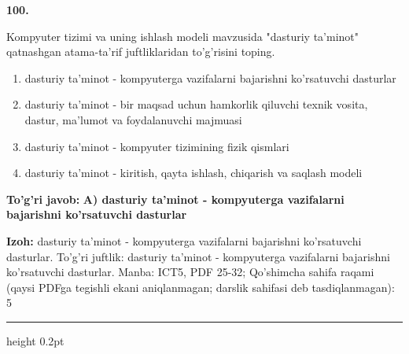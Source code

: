 \documentclass[10pt,a4paper]{article}
\begin{document}
{\bfseries\sffamily\color{ink} 100.}
\par
Kompyuter tizimi va uning ishlash modeli mavzusida "dasturiy ta'minot" qatnashgan atama-ta'rif juftliklaridan to'g'risini toping.
\begin{enumerate}[label=\Alph*),leftmargin=9mm]
\item dasturiy ta'minot - kompyuterga vazifalarni bajarishni ko'rsatuvchi dasturlar
\item dasturiy ta'minot - bir maqsad uchun hamkorlik qiluvchi texnik vosita, dastur, ma'lumot va foydalanuvchi majmuasi
\item dasturiy ta'minot - kompyuter tizimining fizik qismlari
\item dasturiy ta'minot - kiritish, qayta ishlash, chiqarish va saqlash modeli
\end{enumerate}
\begin{tcolorbox}[enhanced,breakable,colback=teal!4,colframe=teal!60!black,boxrule=0.45pt,arc=1.2mm,left=2.7mm,right=2.7mm,top=1.8mm,bottom=1.8mm,before skip=2mm,after skip=2mm]
{\bfseries\sffamily\color{teal}To'g'ri javob:} \textbf{A) dasturiy ta'minot - kompyuterga vazifalarni bajarishni ko'rsatuvchi dasturlar}
\par\smallskip
{\bfseries Izoh:} dasturiy ta'minot - kompyuterga vazifalarni bajarishni ko'rsatuvchi dasturlar. To'g'ri juftlik: dasturiy ta'minot - kompyuterga vazifalarni bajarishni ko'rsatuvchi dasturlar. Manba: ICT5, PDF 25-32; Qo'shimcha sahifa raqami (qaysi PDFga tegishli ekani aniqlanmagan; darslik sahifasi deb tasdiqlanmagan): 5
\end{tcolorbox}
\vspace{2mm}\hrule height 0.2pt\vspace{3mm}
\end{document}
